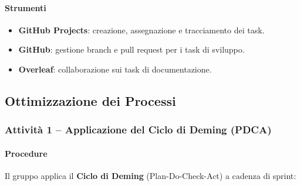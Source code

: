 \documentclass[a4paper, 11pt, oneside]{scrartcl}
\begin{document}
\paragraph{Strumenti}
\begin{itemize}
    \item \textbf{GitHub Projects}: creazione, assegnazione e tracciamento dei task.
    \item \textbf{GitHub}: gestione branch e pull request per i task di sviluppo.
    \item \textbf{Overleaf}: collaborazione sui task di documentazione.
\end{itemize}

\subsection{Ottimizzazione dei Processi}

\subsubsection{Attività 1 – Applicazione del Ciclo di Deming (PDCA{\scriptsize{}})}

\paragraph{Procedure}
Il gruppo applica il \textbf{Ciclo di Deming}{\scriptsize{}} (Plan-Do-Check-Act) a cadenza di sprint:
\end{document}
